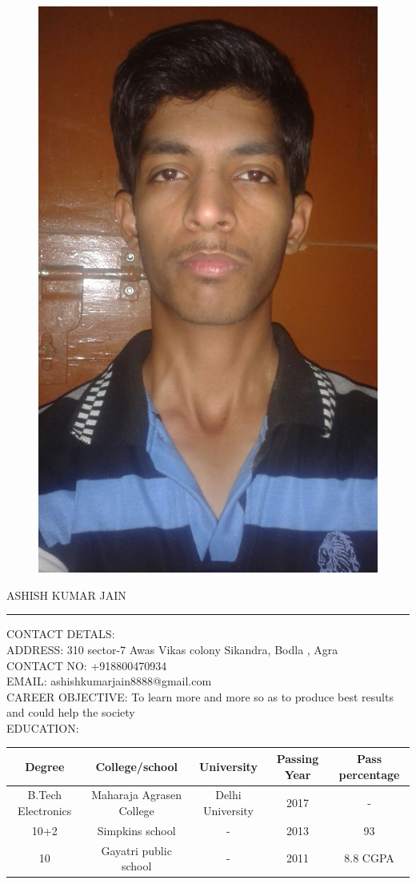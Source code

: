 \documentclass[11pt,a4paper]{article}
\begin{document}
\begin{figure}[t]
\includegraphics[width=0.2\linewidth]{pic}

\end{figure}

\textsf{\huge \bigskip ASHISH KUMAR JAIN}
\hrule
\large
\begin{flushleft}
	
	\textsf{CONTACT DETALS}:\\
	\textsf{ADDRESS:} 310 sector-7 Awas Vikas colony Sikandra, Bodla , Agra\\
	\textsf{CONTACT NO:} +918800470934\\
	\textsf{EMAIL:} ashishkumarjain8888@gmail.com\\ 
		\textsf{CAREER OBJECTIVE:}  To learn more and more so as to produce best results and could help the society\\
		\textsf{\bigskip  EDUCATION}:\\
		
		\begin{tabular}{|c|c|c|c|c|}
			\hline \textbf{ Degree}  &\textsf{College/school}  & \textsf{University} & \textsf{Passing Year} & \textsf{Pass percentage} \\ 
			\hline B.Tech Electronics & Maharaja Agrasen College  & Delhi University & 2017 & - \\ 
			\hline 
			10+2 & Simpkins school & - & 2013 & 93 \\
			
			\hline
			
			10 & Gayatri public school & - & 2011 & 8.8 CGPA \\
			
		\end{tabular} 
		\bigskip
		

\end{flushleft}
\end{document}
